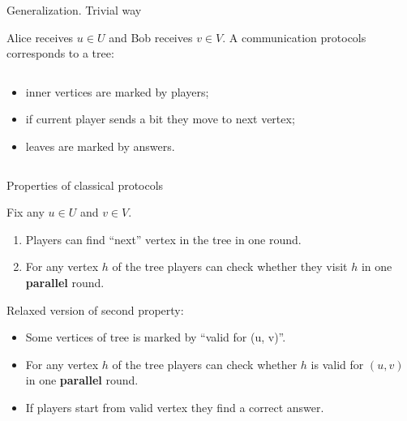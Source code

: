 \begin{frame}{Generalization. Trivial way}

    Alice receives $u \in U$ and Bob receives $v \in V$. A communication protocols corresponds to a tree:

    \begin{columns}[t]
		\begin{column}{0.7\textwidth}
            \begin{itemize}
                \item<2-> inner vertices are marked by players;
	            \item<3-> if current player sends a bit they move to next vertex;
    		    \item<8-> leaves are marked by answers.
	        \end{itemize}



        \end{column}
        
		\begin{column}{0.25\textwidth}
            
		\end{column}
	\end{columns}

\end{frame}

\begin{frame}{Properties of classical protocols}

    Fix any $u \in U$ and $v \in V$.

    \pause
    \begin{enumerate}
        \item Players can find ``next'' vertex in the tree in one round.
        \item For any vertex $h$ of the tree players can check whether they visit $h$ in one
            \textbf{parallel} round.
    \end{enumerate}

    \pause
    Relaxed version of second property:
    \begin{itemize}
        \item Some vertices of tree is marked by ``valid for (u, v)''.
        \item For any vertex $h$ of the tree players can check whether $h$ is valid for $(u, v)$ in one
            \textbf{parallel} round.
        \item If players start from valid vertex they find a correct answer.
    \end{itemize}
    
\end{frame}

